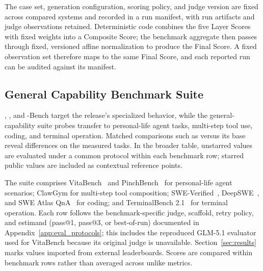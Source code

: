 The case set, generation configuration, scoring policy, and judge version are fixed across compared systems and recorded in a run manifest, with run artifacts and judge observations retained. Deterministic code combines the five Layer Scores with fixed weights into a Composite Score; the benchmark aggregate then passes through fixed, versioned affine normalization to produce the Final Score. A fixed observation set therefore maps to the same Final Score, and each reported run can be audited against its manifest.

\subsection{General Capability Benchmark Suite}
\label{sec:general_bench}

\chatbench{}, \livingbench{}, and \uifora{}-Bench target the release's specialized behavior, while the general-capability suite probes transfer to personal-life agent tasks, multi-step tool use, coding, and terminal operation. Matched comparisons such as \tall{} versus its base reveal differences on the measured tasks. In the broader \venti{} table, unstarred values are evaluated under a common protocol within each benchmark row; starred public values are included as contextual reference points.

The suite comprises VitaBench~\citep{vitabench2026} and PinchBench~\citep{pinchbench2026} for personal-life agent scenarios; ClawGym for multi-step tool composition; SWE-Verified~\citep{jimenez2024swebench}, DeepSWE~\citep{deepswe2026}, and SWE Atlas QnA~\citep{sweatlas2026} for coding; and TerminalBench 2.1~\citep{terminalbench2026} for terminal operation. Each row follows the benchmark-specific judge, scaffold, retry policy, and estimand (pass@1, pass@3, or best-of-run) documented in Appendix~\ref{app:eval_protocols}; this includes the reproduced GLM-5.1 evaluator used for VitaBench because its original judge is unavailable. Section~\ref{sec:results} marks values imported from external leaderboards. Scores are compared within benchmark rows rather than averaged across unlike metrics.

